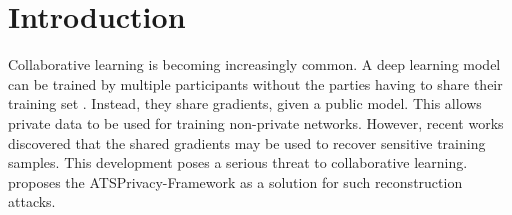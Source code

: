 



\clearpage


\newpage


\section{Introduction}
Collaborative learning is becoming increasingly common. A deep learning model can be trained by multiple participants without the parties having to share their training set  \cite{yang2019federated, guo2020towards, melis2019exploiting}. Instead, they share gradients, given a public model. This allows private data to be used for training non-private networks. However, recent works discovered that the shared gradients may be used to recover sensitive training samples. This development poses a serious threat to collaborative learning. \citeauthor{gao2021privacy}\cite{gao2021privacy} proposes the ATSPrivacy-Framework as a solution for such reconstruction attacks.

